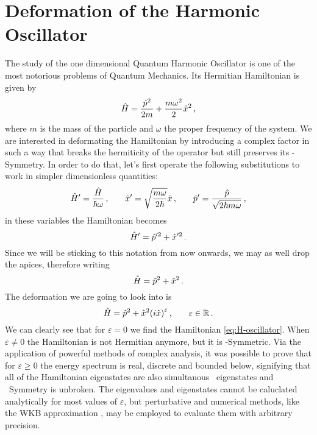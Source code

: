         \section{Deformation of the Harmonic Oscillator}\label{s:deformed-harmonic-oscillator}
            The study of the one dimensional Quantum Harmonic Oscillator is one of the most notorious problems of Quantum Mechanics. Its Hermitian Hamiltonian is given by
            \begin{equation}
                \hat{H} = \frac{\hat{p}^2}{2m} + \frac{m\omega^2}{2}\hat{x}^2\,\text{,}
            \end{equation}
            where $m$ is the mass of the particle and $\omega$ the proper frequency of the system. We are interested in deformating the Hamiltonian by introducing a complex factor in such a way that breaks the hermiticity of the operator but still preserves its \PT-Symmetry. In order to do that, let's first operate the following substitutions to work in simpler dimensionless quantities:
            \begin{equation}
                \hat{H}' = \frac{\hat{H}}{\hbar\omega}
                \,\text{,}\qquad
                \hat{x}' = \sqrt{\frac{m\omega}{2\hbar}}\hat{x}
                \,\text{,}\qquad
                \hat{p}' = \frac{\hat{p}}{\sqrt{2 \hbar m \omega}}
                \,\text{,}
            \end{equation}
            in these variables the Hamiltonian becomes
            \begin{equation*}
                \hat{H}' = \hat{p}'^2 + \hat{x}'^2
                \,\text{.}
            \end{equation*}
            Since we will be sticking to this notation from now onwards, we may as well drop the apices, therefore writing
            \begin{equation}
                \label{eq:H-oscillator}
                \hat{H} = \hat{p}^2 + \hat{x}^2
                \,\text{.}
            \end{equation}
            The deformation we are going to look into is
            \begin{equation}
                \hH = \hp^2 + \hx^2\pqty{i\hx}^\varepsilon
                \mycomma\qquad
                \varepsilon \in \bbR
                \myperiod
            \end{equation}
            We can clearly see that for $\varepsilon = 0$ we find the Hamiltonian \eqref{eq:H-oscillator}. When $\varepsilon \neq 0$ the Hamiltonian is not Hermitian anymore, but it is \PT-Symmetric. Via the application of powerful methods of complex analysis, it was possible to prove that for $\varepsilon \geq 0$ the energy spectrum is real, discrete and bounded below, signifying that all of the Hamiltonian eigenstates are also simultanous \hPT\ eigenstates and \PT\ Symmetry is unbroken. The eigenvalues and eigenstates cannot be caluclated analytically for most values of $\varepsilon$, but perturbative and numerical methods, like the WKB approximation \cite{Bender2007}, may be employed to evaluate them with arbitrary precision.

